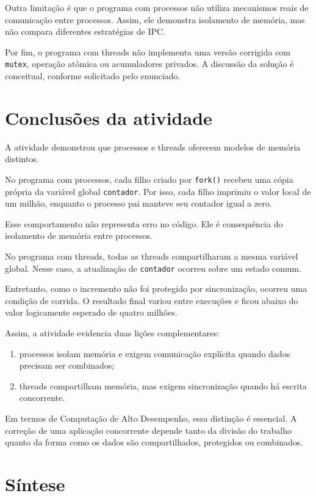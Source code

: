 Outra limitação é que o programa com processos não utiliza mecanismos reais de comunicação entre processos. Assim, ele demonstra isolamento de memória, mas não compara diferentes estratégias de IPC.

Por fim, o programa com threads não implementa uma versão corrigida com \texttt{mutex}, operação atômica ou acumuladores privados. A discussão da solução é conceitual, conforme solicitado pelo enunciado.

\section{Conclusões da atividade}
\label{sec:atvd03-conclusao}

A atividade demonstrou que processos e threads oferecem modelos de memória distintos.

No programa com processos, cada filho criado por \texttt{fork()} recebeu uma cópia própria da variável global \texttt{contador}. Por isso, cada filho imprimiu o valor local de um milhão, enquanto o processo pai manteve seu contador igual a zero.

Esse comportamento não representa erro no código. Ele é consequência do isolamento de memória entre processos.

No programa com threads, todas as threads compartilharam a mesma variável global. Nesse caso, a atualização de \texttt{contador} ocorreu sobre um estado comum.

Entretanto, como o incremento não foi protegido por sincronização, ocorreu uma condição de corrida. O resultado final variou entre execuções e ficou abaixo do valor logicamente esperado de quatro milhões.

Assim, a atividade evidencia duas lições complementares:

\begin{enumerate}
    \item processos isolam memória e exigem comunicação explícita quando dados precisam ser combinados;
    \item threads compartilham memória, mas exigem sincronização quando há escrita concorrente.
\end{enumerate}

Em termos de Computação de Alto Desempenho, essa distinção é essencial. A correção de uma aplicação concorrente depende tanto da divisão do trabalho quanto da forma como os dados são compartilhados, protegidos ou combinados.

\section{Síntese}
\label{sec:atvd03-defesa}

